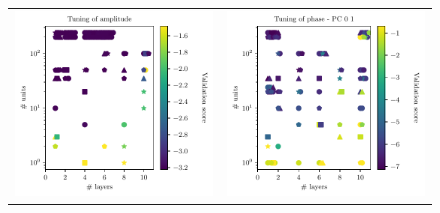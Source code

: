 \documentclass[twocolumn,showpacs,preprintnumbers,nofootinbib,prd,
superscriptaddress,10pt]{revtex4-2}
\begin{document}
\begin{figure}[t]
	\begin{tabular}{cc}
		\includegraphics[scale = 0.9]{tuning_amp} &
		\includegraphics[scale = 0.9]{tuning_ph_01} \\

\end{tabular}
\end{figure}
\end{document}
